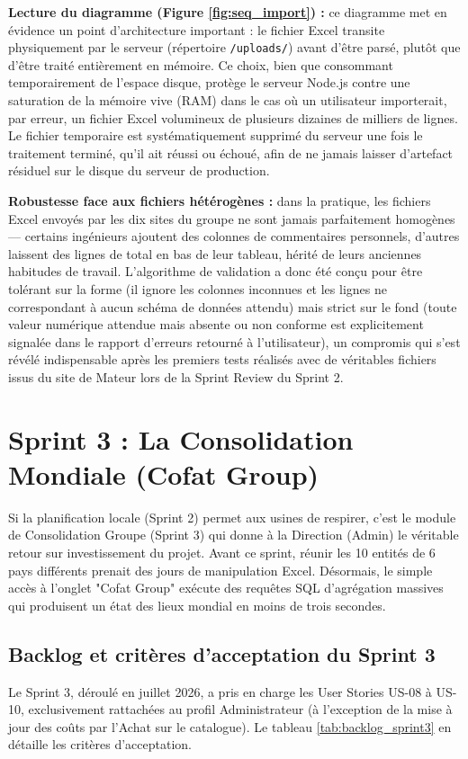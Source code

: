 \textbf{Lecture du diagramme (Figure \ref{fig:seq_import}) :} ce diagramme met en évidence un point d'architecture important : le fichier Excel transite physiquement par le serveur (répertoire \texttt{/uploads/}) avant d'être parsé, plutôt que d'être traité entièrement en mémoire. Ce choix, bien que consommant temporairement de l'espace disque, protège le serveur Node.js contre une saturation de la mémoire vive (RAM) dans le cas où un utilisateur importerait, par erreur, un fichier Excel volumineux de plusieurs dizaines de milliers de lignes. Le fichier temporaire est systématiquement supprimé du serveur une fois le traitement terminé, qu'il ait réussi ou échoué, afin de ne jamais laisser d'artefact résiduel sur le disque du serveur de production.

\textbf{Robustesse face aux fichiers hétérogènes :} dans la pratique, les fichiers Excel envoyés par les dix sites du groupe ne sont jamais parfaitement homogènes — certains ingénieurs ajoutent des colonnes de commentaires personnels, d'autres laissent des lignes de total en bas de leur tableau, hérité de leurs anciennes habitudes de travail. L'algorithme de validation a donc été conçu pour être tolérant sur la forme (il ignore les colonnes inconnues et les lignes ne correspondant à aucun schéma de données attendu) mais strict sur le fond (toute valeur numérique attendue mais absente ou non conforme est explicitement signalée dans le rapport d'erreurs retourné à l'utilisateur), un compromis qui s'est révélé indispensable après les premiers tests réalisés avec de véritables fichiers issus du site de Mateur lors de la Sprint Review du Sprint 2.

\section{Sprint 3 : La Consolidation Mondiale (Cofat Group)}
Si la planification locale (Sprint 2) permet aux usines de respirer, c'est le module de Consolidation Groupe (Sprint 3) qui donne à la Direction (Admin) le véritable retour sur investissement du projet. 
Avant ce sprint, réunir les 10 entités de 6 pays différents prenait des jours de manipulation Excel. Désormais, le simple accès à l'onglet "Cofat Group" exécute des requêtes SQL d'agrégation massives qui produisent un état des lieux mondial en moins de trois secondes.

\subsection{Backlog et critères d'acceptation du Sprint 3}
Le Sprint 3, déroulé en juillet 2026, a pris en charge les User Stories US-08 à US-10, exclusivement rattachées au profil Administrateur (à l'exception de la mise à jour des coûts par l'Achat sur le catalogue). Le tableau \ref{tab:backlog_sprint3} en détaille les critères d'acceptation.

